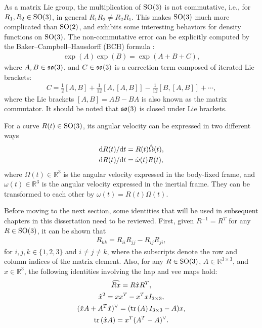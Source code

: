 As a matrix Lie group, the multiplication of $\mathrm{SO}(3)$ is not commutative, i.e., for $R_1, R_2\in\mathrm{SO}(3)$, in general $R_1R_2 \neq R_2R_1$.
This makes $\mathrm{SO}(3)$ much more complicated than $\mathrm{SO}(2)$, and exhibits some interesting behaviors for density functions on $\mathrm{SO}(3)$.
The non-commutative error can be explicitly computed by the Baker–Campbell–Hausdorff (BCH) formula \cite{hall2003lie}:
\begin{align}
	\exp(A) \exp(B) = \exp(A+B+C),
\end{align}
where $A,B\in\mathfrak{so}(3)$, and $C\in\mathfrak{so}(3)$ is a correction term composed of iterated Lie brackets:
\begin{align}
	C = \frac{1}{2}[A,B] + \frac{1}{12}[A,[A,B]] - \frac{1}{12}[B,[A,B]] + \cdots,
\end{align}
where the Lie brackets $[A,B] = AB-BA$ is also known as the matrix commutator.
It should be noted that $\mathfrak{so}(3)$ is closed under Lie brackets.

For a curve $R(t)\in\mathrm{SO}(3)$, its angular velocity can be expressed in two different ways
\begin{subequations}
	\begin{align}
		\mathrm{d} R(t) / \mathrm{d} t &= R(t)\hat{\Omega}(t), \\
		\mathrm{d} R(t) / \mathrm{d} t &= \hat{\omega}(t)R(t),
	\end{align}
\end{subequations}
where $\Omega(t)\in\mathbb{R}^3$ is the angular velocity expressed in the body-fixed frame, and $\omega(t)\in\mathbb{R}^3$ is the angular velocity expressed in the inertial frame.
They can be transformed to each other by $\omega(t) = R(t)\Omega(t)$.

Before moving to the next section, some identities that will be used in subsequent chapters in this dissertation need to be reviewed.
First, given $R^{-1} = R^T$ for any $R\in\mathrm{SO}(3)$, it can be shown that
\begin{align} \label{eqn:SO3-Rkk}
	R_{kk} = R_{ii}R_{jj} - R_{ij}R_{ji},
\end{align}
for $i,j,k\in\{1,2,3\}$ and $i\neq j\neq k$, where the subscripts denote the row and column indices of the matrix element.
Also, for any $R\in\mathrm{SO}(3)$, $A\in\mathbb{R}^{3\times 3}$, and $x\in\mathbb{R}^{3}$, the following identities involving the hap and vee maps hold:
\begin{gather}
	\widehat{Rx} = R\hat{x}R^T, \\
	\hat{x}^2 = xx^T - x^TxI_{3 \times 3}, \label{eqn:SO3-hatx^2} \\
	(\hat{x}A+A^T\hat{x})^\vee = (\mathrm{tr}\left( A \right)I_{3 \times 3}-A)x, \\
	\mathrm{tr}\left( \hat x A \right) = x^T(A^T -A)^\vee. \label{eqn:SO3-trhatxA}
\end{gather}

